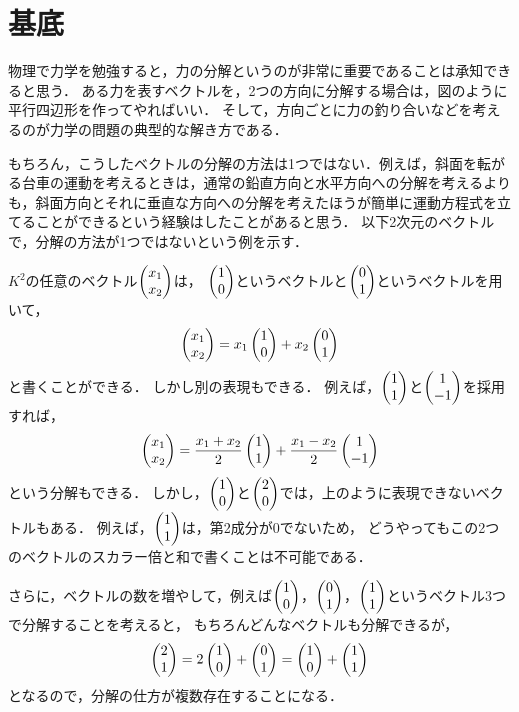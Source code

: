 \section{基底}
物理で力学を勉強すると，力の分解というのが非常に重要であることは承知できると思う．
ある力を表すベクトルを，2つの方向に分解する場合は，図のように平行四辺形を作ってやればいい．
そして，方向ごとに力の釣り合いなどを考えるのが力学の問題の典型的な解き方である．

もちろん，こうしたベクトルの分解の方法は1つではない．例えば，斜面を転がる台車の運動を考えるときは，通常の鉛直方向と水平方向への分解を考えるよりも，斜面方向とそれに垂直な方向への分解を考えたほうが簡単に運動方程式を立てることができるという経験はしたことがあると思う．
以下2次元のベクトルで，分解の方法が1つではないという例を示す．
\begin{example}
    $K^2$の任意のベクトル$\begin{pmatrix} x_1 \\ x_2 \end{pmatrix}$は，
    $\begin{pmatrix} 1 \\ 0 \end{pmatrix}$というベクトルと$\begin{pmatrix} 0 \\ 1 \end{pmatrix}$というベクトルを用いて，
    \[
        \begin{pmatrix} x_1 \\ x_2 \end{pmatrix} = x_1 \begin{pmatrix} 1 \\ 0 \end{pmatrix} + x_2 \begin{pmatrix} 0 \\ 1 \end{pmatrix}
    \]
    と書くことができる．
    しかし別の表現もできる．
    例えば，$\begin{pmatrix} 1 \\ 1 \end{pmatrix}$と$\begin{pmatrix} 1 \\ -1 \end{pmatrix}$を採用すれば，
    \[
        \begin{pmatrix} x_1 \\ x_2 \end{pmatrix} = \frac{x_1 + x_2}{2} \begin{pmatrix} 1 \\ 1 \end{pmatrix} + \frac{x_1 - x_2}{2} \begin{pmatrix} 1 \\ -1 \end{pmatrix}
    \]
    という分解もできる．
    しかし，$\begin{pmatrix} 1 \\ 0 \end{pmatrix}$と$\begin{pmatrix} 2 \\ 0 \end{pmatrix}$では，上のように表現できないベクトルもある．
    例えば，$\begin{pmatrix} 1 \\ 1 \end{pmatrix}$は，第2成分が0でないため，
    どうやってもこの2つのベクトルのスカラー倍と和で書くことは不可能である．
    
    さらに，ベクトルの数を増やして，例えば$\begin{pmatrix} 1 \\ 0 \end{pmatrix}$，$\begin{pmatrix} 0 \\ 1 \end{pmatrix}$，$\begin{pmatrix} 1 \\ 1 \end{pmatrix}$というベクトル3つで分解することを考えると，
    もちろんどんなベクトルも分解できるが，
    \[
        \begin{pmatrix} 2 \\ 1 \end{pmatrix} = 2 \begin{pmatrix} 1 \\ 0 \end{pmatrix} + \begin{pmatrix} 0 \\ 1 \end{pmatrix} = \begin{pmatrix} 1 \\ 0 \end{pmatrix} + \begin{pmatrix} 1 \\ 1 \end{pmatrix}
    \]
    となるので，分解の仕方が複数存在することになる．
\end{example}
